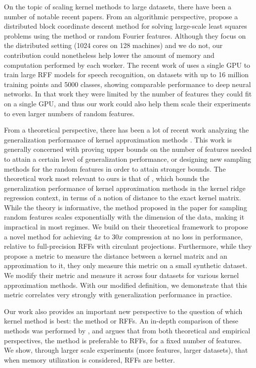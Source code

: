 On the topic of scaling kernel methods to large datasets, there have been a number of notable recent papers.  From an algorithmic perspective, \citet{block16} propose a distributed block coordinate descent method for solving large-scale least squares problems using the \Nystrom method or random Fourier features. Although they focus on the distributed setting (1024 cores on 128 machines) and we do not, our contribution could nonetheless help lower the amount of memory and computation performed by each worker.  The recent work of \citet{may2017} uses a single GPU to train large RFF models for speech recognition, on datasets with up to 16 million training points and 5000 classes, showing comparable performance to deep neural networks. In that work they were limited by the number of features they could fit on a single GPU, and thus our work could also help them scale their experiments to even larger numbers of random features.

From a theoretical perspective, there has been a lot of recent work analyzing the generalization performance of kernel approximation methods \citep{bach13,alaoui15,rudi15,optrff15,musco17,rudi17,bach17,avron17}. This work is generally concerned with proving upper bounds on the number of features needed to attain a certain level of generalization performance, or designing new sampling methods for the random features in order to attain stronger bounds. The theoretical work most relevant to ours is that of \citet{avron17}, which bounds the generalization performance of kernel approximation methods in the kernel ridge regression context, in terms of a notion of distance to the exact kernel matrix.  While the theory is informative, the method proposed in the paper for sampling random features scales exponentially with the dimension of the data, making it impractical in most regimes. We build on their theoretical framework to propose a novel method for achieving $4x$ to $30x$ compression at no loss in performance, relative to full-precision RFFs with circulant projections. Furthermore, while they propose a metric to measure the distance between a kernel matrix and an approximation to it, they only measure this metric on a small synthetic dataset. We modify their metric and measure it across four datasets for various kernel approximation methods. With our modified definition, we demonstrate that this metric correlates very strongly with generalization performance in practice.

Our work also provides an important new perspective to the question of which kernel method is best: the \Nystrom method or RFFs. An in-depth comparison of these methods was performed by \citet{nysvsrff12}, and argues that from both theoretical and empirical perspectives, the \Nystrom method is preferable to RFFs, for a fixed number of features. We show, through larger scale experiments (more features, larger datasets), that when memory utilization is considered, RFFs are better.


